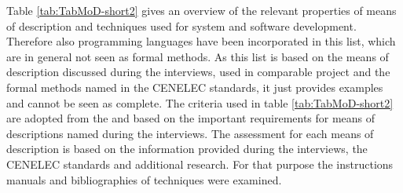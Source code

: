 \documentclass{./template/openetcs_report}
\begin{document}
Table \ref{tab:TabMoD-short2} gives an overview of the relevant properties of means of description and techniques used for system  and software development. Therefore also programming languages have been incorporated in this list, which are in general not seen as formal methods. As this list is based on the means of description discussed during the interviews, used in comparable project and the formal methods named in the CENELEC standards, it just provides examples and cannot be seen as complete. The criteria used in table \ref{tab:TabMoD-short2} are adopted from the \citeauthor{VDIVDE3681} and based on the important requirements for means of descriptions named during the interviews. The assessment for each means of description is based on the information provided during the interviews, the CENELEC standards and additional research. For that purpose the instructions manuals and  bibliographies of techniques were examined.
\end{document}
